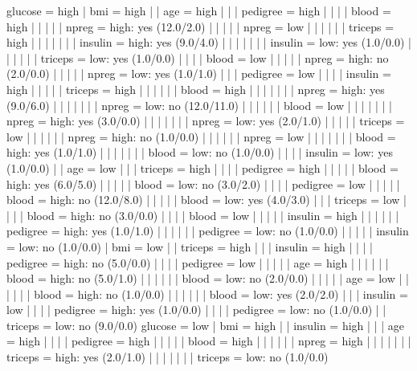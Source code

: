 glucose = high
|   bmi = high
|   |   age = high
|   |   |   pedigree = high
|   |   |   |   blood = high
|   |   |   |   |   npreg = high: yes (12.0/2.0)
|   |   |   |   |   npreg = low
|   |   |   |   |   |   triceps = high
|   |   |   |   |   |   |   insulin = high: yes (9.0/4.0)
|   |   |   |   |   |   |   insulin = low: yes (1.0/0.0)
|   |   |   |   |   |   triceps = low: yes (1.0/0.0)
|   |   |   |   blood = low
|   |   |   |   |   npreg = high: no (2.0/0.0)
|   |   |   |   |   npreg = low: yes (1.0/1.0)
|   |   |   pedigree = low
|   |   |   |   insulin = high
|   |   |   |   |   triceps = high
|   |   |   |   |   |   blood = high
|   |   |   |   |   |   |   npreg = high: yes (9.0/6.0)
|   |   |   |   |   |   |   npreg = low: no (12.0/11.0)
|   |   |   |   |   |   blood = low
|   |   |   |   |   |   |   npreg = high: yes (3.0/0.0)
|   |   |   |   |   |   |   npreg = low: yes (2.0/1.0)
|   |   |   |   |   triceps = low
|   |   |   |   |   |   npreg = high: no (1.0/0.0)
|   |   |   |   |   |   npreg = low
|   |   |   |   |   |   |   blood = high: yes (1.0/1.0)
|   |   |   |   |   |   |   blood = low: no (1.0/0.0)
|   |   |   |   insulin = low: yes (1.0/0.0)
|   |   age = low
|   |   |   triceps = high
|   |   |   |   pedigree = high
|   |   |   |   |   blood = high: yes (6.0/5.0)
|   |   |   |   |   blood = low: no (3.0/2.0)
|   |   |   |   pedigree = low
|   |   |   |   |   blood = high: no (12.0/8.0)
|   |   |   |   |   blood = low: yes (4.0/3.0)
|   |   |   triceps = low
|   |   |   |   blood = high: no (3.0/0.0)
|   |   |   |   blood = low
|   |   |   |   |   insulin = high
|   |   |   |   |   |   pedigree = high: yes (1.0/1.0)
|   |   |   |   |   |   pedigree = low: no (1.0/0.0)
|   |   |   |   |   insulin = low: no (1.0/0.0)
|   bmi = low
|   |   triceps = high
|   |   |   insulin = high
|   |   |   |   pedigree = high: no (5.0/0.0)
|   |   |   |   pedigree = low
|   |   |   |   |   age = high
|   |   |   |   |   |   blood = high: no (5.0/1.0)
|   |   |   |   |   |   blood = low: no (2.0/0.0)
|   |   |   |   |   age = low
|   |   |   |   |   |   blood = high: no (1.0/0.0)
|   |   |   |   |   |   blood = low: yes (2.0/2.0)
|   |   |   insulin = low
|   |   |   |   pedigree = high: yes (1.0/0.0)
|   |   |   |   pedigree = low: no (1.0/0.0)
|   |   triceps = low: no (9.0/0.0)
glucose = low
|   bmi = high
|   |   insulin = high
|   |   |   age = high
|   |   |   |   pedigree = high
|   |   |   |   |   blood = high
|   |   |   |   |   |   npreg = high
|   |   |   |   |   |   |   triceps = high: yes (2.0/1.0)
|   |   |   |   |   |   |   triceps = low: no (1.0/0.0)
